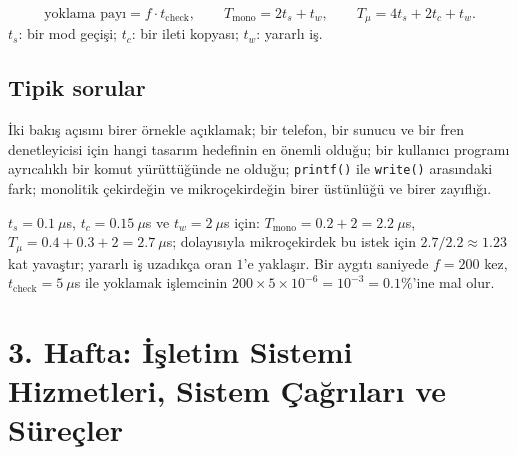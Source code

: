 \documentclass[11pt,a4paper]{article}
\newcommand{\cmd}[1]{\texttt{#1}}
\begin{document}
\begin{keyidea}
\[
\text{yoklama payı} = f \cdot t_{\text{check}}, \qquad
T_{\text{mono}} = 2t_{s} + t_{w}, \qquad
T_{\mu} = 4t_{s} + 2t_{c} + t_{w}.
\]
$t_s$: bir mod geçişi; $t_c$: bir ileti kopyası; $t_w$: yararlı iş.
\end{keyidea}

\subsection*{Tipik sorular}
İki bakış açısını birer örnekle açıklamak; bir telefon, bir sunucu ve bir fren denetleyicisi için hangi tasarım hedefinin en önemli olduğu; bir kullanıcı programı ayrıcalıklı bir komut yürüttüğünde ne olduğu; \cmd{printf()} ile \cmd{write()} arasındaki fark; monolitik çekirdeğin ve mikroçekirdeğin birer üstünlüğü ve birer zayıflığı.

\begin{example}
$t_s = 0.1\ \mu$s, $t_c = 0.15\ \mu$s ve $t_w = 2\ \mu$s için: $T_{\text{mono}} = 0.2 + 2 = 2.2\ \mu$s, $T_{\mu} = 0.4 + 0.3 + 2 = 2.7\ \mu$s; dolayısıyla mikroçekirdek bu istek için $2.7/2.2 \approx 1.23$ kat yavaştır; yararlı iş uzadıkça oran $1$'e yaklaşır. Bir aygıtı saniyede $f = 200$ kez, $t_{\text{check}} = 5\ \mu$s ile yoklamak işlemcinin $200 \times 5\times10^{-6} = 10^{-3} = 0.1\%$'ine mal olur.
\end{example}

\section{3. Hafta: İşletim Sistemi Hizmetleri, Sistem Çağrıları ve Süreçler}
\label{sec:w3}
\end{document}

